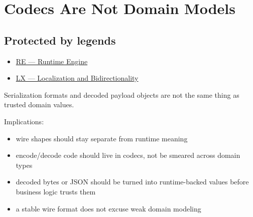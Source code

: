 \chapter{Codecs Are Not Domain Models}\label{record-037}

\smallskip

\section{Protected by legends}\label{record-037-protected-by-legends}

\begin{itemize}
\tightlist
\item
  \href{https://github.com/flyingrobots/bijou/blob/1853ad902f6bf219326409e7f743a5a1d6517dbc/docs/legends/RE-runtime-engine.md}{RE --- Runtime Engine}
\item
  \href{https://github.com/flyingrobots/bijou/blob/1853ad902f6bf219326409e7f743a5a1d6517dbc/docs/legends/LX-localization-and-bidirectionality.md}{LX --- Localization and Bidirectionality}
\end{itemize}

Serialization formats and decoded payload objects are not the same thing as trusted domain values.

Implications:

\begin{itemize}
\tightlist
\item
  wire shapes should stay separate from runtime meaning
\item
  encode/decode code should live in codecs, not be smeared across domain types
\item
  decoded bytes or JSON should be turned into runtime-backed values before business logic trusts them
\item
  a stable wire format does not excuse weak domain modeling
\end{itemize}

